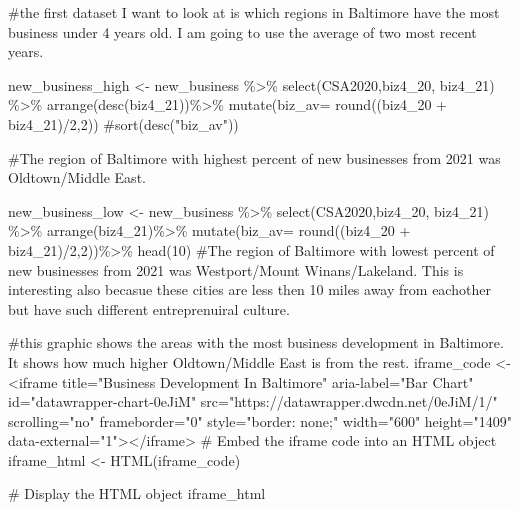 \documentclass[
  letterpaper,
  DIV=11,
  numbers=noendperiod]{scrartcl}
\newenvironment{Shaded}{\begin{snugshade}}{\end{snugshade}}
\newcommand{\AttributeTok}[1]{\textcolor[rgb]{0.40,0.45,0.13}{#1}}
\newcommand{\CommentTok}[1]{\textcolor[rgb]{0.37,0.37,0.37}{#1}}
\newcommand{\DecValTok}[1]{\textcolor[rgb]{0.68,0.00,0.00}{#1}}
\newcommand{\FunctionTok}[1]{\textcolor[rgb]{0.28,0.35,0.67}{#1}}
\newcommand{\NormalTok}[1]{\textcolor[rgb]{0.00,0.23,0.31}{#1}}
\newcommand{\OtherTok}[1]{\textcolor[rgb]{0.00,0.23,0.31}{#1}}
\newcommand{\SpecialCharTok}[1]{\textcolor[rgb]{0.37,0.37,0.37}{#1}}
\newcommand{\StringTok}[1]{\textcolor[rgb]{0.13,0.47,0.30}{#1}}
\begin{document}
\begin{Shaded}
\begin{Highlighting}[]
\CommentTok{\#the first dataset I want to look at is which regions in Baltimore have the most business under 4 years old. I am going to use the average of two most recent years. }

\NormalTok{new\_business\_high }\OtherTok{\textless{}{-}}\NormalTok{ new\_business  }\SpecialCharTok{\%\textgreater{}\%}
 \FunctionTok{select}\NormalTok{(CSA2020,biz4\_20, biz4\_21) }\SpecialCharTok{\%\textgreater{}\%}
 \FunctionTok{arrange}\NormalTok{(}\FunctionTok{desc}\NormalTok{(biz4\_21))}\SpecialCharTok{\%\textgreater{}\%}
\FunctionTok{mutate}\NormalTok{(}\AttributeTok{biz\_av=} \FunctionTok{round}\NormalTok{((biz4\_20 }\SpecialCharTok{+}\NormalTok{ biz4\_21)}\SpecialCharTok{/}\DecValTok{2}\NormalTok{,}\DecValTok{2}\NormalTok{))}
 \CommentTok{\#sort(desc("biz\_av"))}

\CommentTok{\#The region of Baltimore with highest percent of new businesses from 2021 was Oldtown/Middle East. }

\NormalTok{new\_business\_low }\OtherTok{\textless{}{-}}\NormalTok{ new\_business  }\SpecialCharTok{\%\textgreater{}\%}
 \FunctionTok{select}\NormalTok{(CSA2020,biz4\_20, biz4\_21) }\SpecialCharTok{\%\textgreater{}\%}
  \FunctionTok{arrange}\NormalTok{(biz4\_21)}\SpecialCharTok{\%\textgreater{}\%}
  \FunctionTok{mutate}\NormalTok{(}\AttributeTok{biz\_av=} \FunctionTok{round}\NormalTok{((biz4\_20 }\SpecialCharTok{+}\NormalTok{ biz4\_21)}\SpecialCharTok{/}\DecValTok{2}\NormalTok{,}\DecValTok{2}\NormalTok{))}\SpecialCharTok{\%\textgreater{}\%} 
\FunctionTok{head}\NormalTok{(}\DecValTok{10}\NormalTok{)}
\CommentTok{\#The region of Baltimore with lowest percent of new businesses from 2021 was Westport/Mount Winans/Lakeland. This is interesting also becasue these cities are less then 10 miles away from eachother but have such different entreprenuiral culture. }
\end{Highlighting}
\end{Shaded}

\begin{Shaded}
\begin{Highlighting}[]
\CommentTok{\#this graphic shows the areas with the most business development in Baltimore. It shows how much higher Oldtown/Middle East is from the rest.}
\NormalTok{iframe\_code }\OtherTok{\textless{}{-}} \StringTok{\textquotesingle{}}
\StringTok{\textless{}iframe title="Business Development In Baltimore" aria{-}label="Bar Chart" id="datawrapper{-}chart{-}0eJiM" src="https://datawrapper.dwcdn.net/0eJiM/1/" scrolling="no" frameborder="0" style="border: none;" width="600" height="1409" data{-}external="1"\textgreater{}\textless{}/iframe\textgreater{}}
\StringTok{\textquotesingle{}}
\CommentTok{\# Embed the iframe code into an HTML object}
\NormalTok{iframe\_html }\OtherTok{\textless{}{-}} \FunctionTok{HTML}\NormalTok{(iframe\_code)}

\CommentTok{\# Display the HTML object}
\NormalTok{iframe\_html}
\end{Highlighting}
\end{Shaded}
\end{document}

